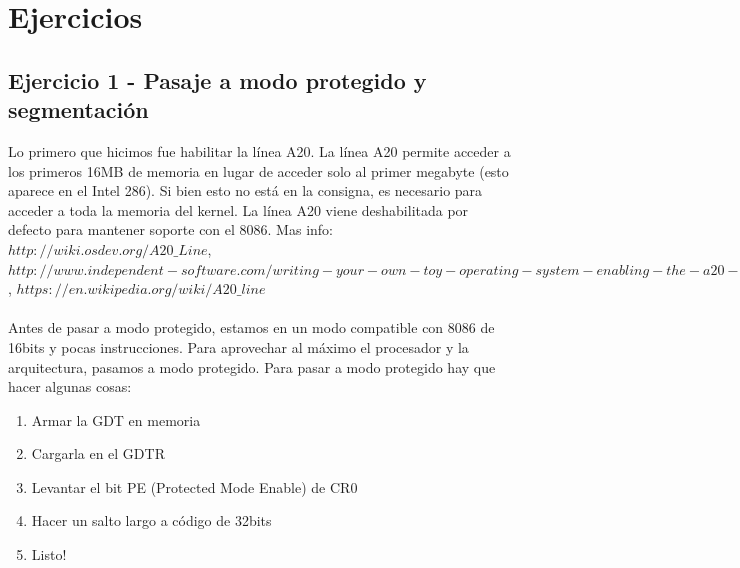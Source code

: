 \documentclass[10pt,a4paper,spanish]{article}
\begin{document}


\maketitle

\newpage


\clearpage

\section{Ejercicios}

\subsection{Ejercicio 1 - Pasaje a modo protegido y segmentación}
Lo primero que hicimos fue habilitar la línea A20. La línea A20 permite acceder a los primeros 16MB de memoria en lugar de acceder solo al primer megabyte (esto aparece en el Intel 286). Si bien esto no está en la consigna, es necesario para acceder a toda la memoria del kernel. La línea A20 viene deshabilitada por defecto para mantener soporte con el 8086.  Mas info: $http://wiki.osdev.org/A20\_Line$, $http://www.independent-software.com/writing-your-own-toy-operating-system-enabling-the-a20-line/$, $https://en.wikipedia.org/wiki/A20\_line$
\\ \\
Antes de pasar a modo protegido, estamos en un modo compatible con 8086 de 16bits y pocas instrucciones. Para aprovechar al máximo el procesador y la arquitectura, pasamos a modo protegido.
Para pasar a modo protegido hay que hacer algunas cosas:
\begin{enumerate}
	\item Armar la GDT en memoria
	\item Cargarla en el GDTR
	\item Levantar el bit PE (Protected Mode Enable) de CR0
	\item Hacer un salto largo a código de 32bits
	\item Listo!
\end{enumerate}
\end{document}
